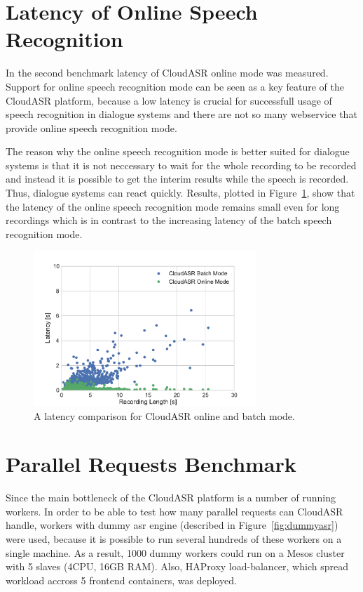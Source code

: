 \section{Latency of Online Speech Recognition}
In the second benchmark latency of CloudASR online mode was measured.
Support for online speech recognition mode can be seen as a key feature of the CloudASR platform,
  because a low latency is crucial for successfull usage of speech recognition in dialogue systems
  and there are not so many webservice that provide online speech recognition mode.

The reason why the online speech recognition mode is better suited for dialogue systems is
  that it is not neccessary to wait for the whole recording to be recorded
  and instead it is possible to get the interim results while the speech is recorded.
Thus, dialogue systems can react quickly.
Results, plotted in Figure~\ref{fig:online-benchmark}, show that
  the latency of the online speech recognition mode remains small even for long recordings
  which is in contrast to the increasing latency of the batch speech recognition mode.

\begin{figure}[h]
  \centering
  \includegraphics[width=0.75\textwidth]{./img/online.pdf}

  \caption{
    A latency comparison for CloudASR online and batch mode.
  }
  \label{fig:online-benchmark}
\end{figure}


\section{Parallel Requests Benchmark}
Since the main bottleneck of the CloudASR platform is a number of running workers.
In order to be able to test how many parallel requests can CloudASR handle,
  workers with dummy asr engine (described in Figure~\ref{fig:dummyasr}) were used,
  because it is possible to run several hundreds of these workers on a single machine.
As a result, 1000 dummy workers could run on a Mesos cluster with 5 slaves (4CPU, 16GB RAM).
Also, HAProxy load-balancer, which spread workload accross 5 frontend containers, was deployed.

